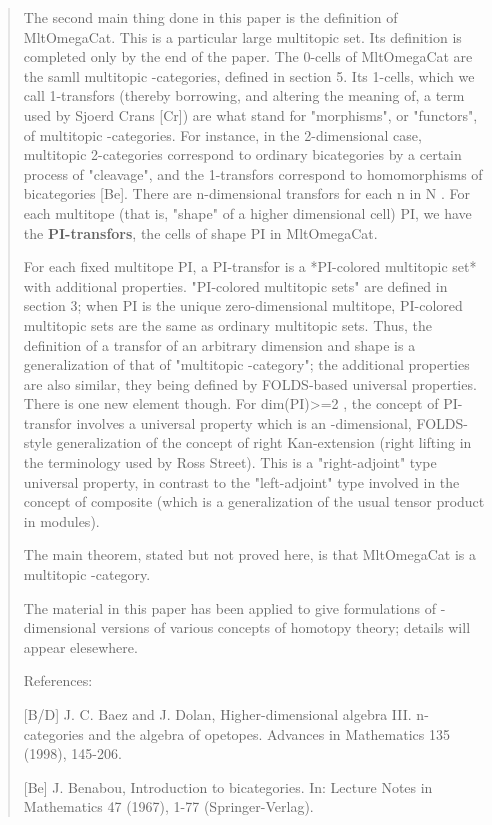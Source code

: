 \begin{quote}
The second main thing done in this paper is the definition of MltOmegaCat.
This is a particular large multitopic set. Its definition is completed
only by the end of the paper. The 0-cells of MltOmegaCat are the samll
multitopic \omega -categories, defined in section 5. Its 1-cells, which we
call 1-transfors (thereby borrowing, and altering the meaning of, a term
used by Sjoerd Crans [Cr]) are what stand for "morphisms", or "functors",
of multitopic \omega -categories. For instance, in the 2-dimensional case,
multitopic 2-categories correspond to ordinary bicategories by a certain
process of "cleavage", and the 1-transfors correspond to homomorphisms of
bicategories [Be]. There are n-dimensional transfors for each n in N . For
each multitope (that is, "shape" of a higher dimensional cell) PI, we
have the \textbf{PI-transfors}, the cells of shape PI in MltOmegaCat.

For each fixed multitope PI, a PI-transfor is a *PI-colored multitopic
set* with additional properties. "PI-colored multitopic sets" are defined
in section 3; when PI is the unique zero-dimensional multitope, PI-colored
multitopic sets are the same as ordinary multitopic sets. Thus, the
definition of a transfor of an arbitrary dimension and shape is a
generalization of that of "multitopic \omega -category"; the additional
properties are also similar, they being defined by FOLDS-based universal
properties. There is one new element though. For dim(PI)>=2 , the concept
of PI-transfor involves a universal property which is an \omega -dimensional, 
FOLDS-style generalization of the concept of right Kan-extension (right 
lifting in the terminology used by Ross Street).  This is a "right-adjoint" 
type universal property, in contrast to the "left-adjoint" type involved 
in the concept of composite (which is a generalization of the usual 
tensor product in modules). 

The main theorem, stated but not proved here, is that MltOmegaCat is a
multitopic \omega -category. 

The material in this paper has been applied to give formulations of
\omega -dimensional versions of various concepts of homotopy theory;
details will appear elesewhere.

References:

[B/D]	J. C. Baez and J. Dolan, Higher-dimensional algebra III.
n-categories and the algebra of opetopes. Advances in Mathematics 135
(1998), 145-206.

[Be]	J. Benabou, Introduction to bicategories. In: Lecture Notes in
Mathematics 47 (1967), 1-77 (Springer-Verlag). 


\end{quote}
